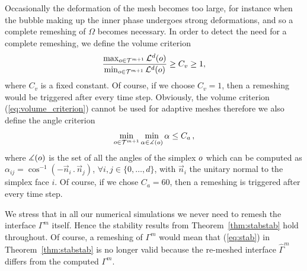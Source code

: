 Occasionally the deformation of the mesh becomes too large, for instance when
the bubble making up the inner phase undergoes strong deformations, and so a
complete remeshing of $\Omega$ becomes necessary. In order to detect the need
for a complete remeshing, we define the volume criterion
\begin{equation}\label{eq:volume_criterion}
\frac{\max_{o\in {\cal T}^{m+1}}\mathcal{L}^d(o)}
{\min_{o\in\mathcal {T}^{m+1}}\mathcal{L}^d(o)} \geq C_v \geq 1,
\end{equation}
where $C_v$ is a fixed constant. Of course, if we choose $C_v = 1$, then a
remeshing would be triggered after every time step. Obviously, the
volume criterion (\ref{eq:volume_criterion}) cannot be used for adaptive
meshes therefore we also define the angle criterion
\begin{equation}\label{eq:angle_criterion}
\min_{o\in {\cal T}^{m+1}}\min_{\alpha\in \measuredangle(o)}\alpha
\leq C_a\,,
\end{equation}
where $\measuredangle(o)$ is the set of all the angles of the simplex
$o$ which can be computed as $\alpha_{ij}=\cos^{-1}(-\vec n_i\,.\,\vec
n_j)$, $\forall i,j\in\{0,\dots,d\}$, with $\vec n_i$ the unitary normal to the
simplex face $i$. Of course, if we chose $C_a=60$\textdegree, then a remeshing
is triggered after every time step.

We stress that in all our numerical simulations we never need to remesh the
interface $\Gamma^m$ itself. Hence the stability results from
Theorem~\ref{thm:stabstab} hold throughout. Of course, a remeshing of $\Gamma^m$
would mean that (\ref{eq:stab}) in Theorem~\ref{thm:stabstab} is no longer
valid because the re-meshed interface $\hat{\Gamma}^m$ differs from the
computed $\Gamma^m$.
